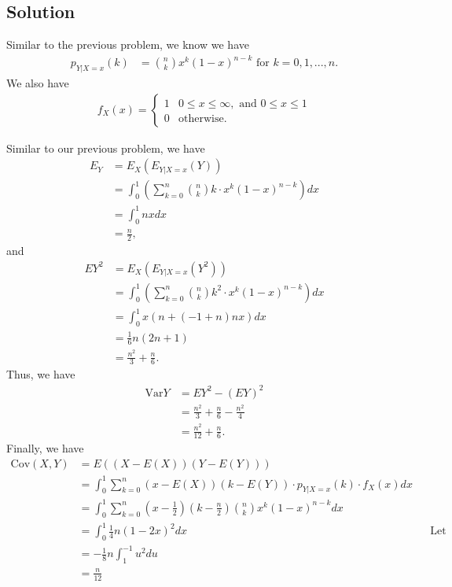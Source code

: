 \documentclass[10pt,a4paper]{article}
\theoremstyle{theorem}
\theoremstyle{definition}
\begin{document}
\subsection*{Solution}
Similar to the previous problem, we know we have
\begin{align*}
p_{Y | X = x}(k) &= {n \choose k} x^k (1 - x)^{n - k} \text{ for } k = 0, 1, ..., n.
\end{align*}
We also have 
\begin{align*}
f_X(x) = \begin{cases} 
      1& 0 \leq x \leq \infty, \text{ and } 0 \leq x \leq 1 \\
      0 & \text{otherwise.}
   \end{cases}
\end{align*}

Similar to our previous problem, we have
\begin{align*}
E_Y &= E_{X}(E_{Y|X = x}(Y))\\
&= \int_0^1 \left(\sum_{k=0}^n  {n \choose k} k \cdot x^k (1 - x)^{n - k} \right) dx\\
&= \int_0^1 nx dx\\
&= \frac{n}{2},
\end{align*}
and
\begin{align*}
EY^2 &= E_{X}(E_{Y|X = x}(Y^2))\\
&= \int_0^1 \left(\sum_{k=0}^n  {n \choose k} k^2 \cdot x^k (1 - x)^{n - k} \right) dx\\
&= \int_0^1 x (n + (-1 + n) n x) dx\\
&= \frac{1}{6} n (2n + 1)\\
&= \frac{n^2}{3} + \frac{n}{6}.
\end{align*}
Thus, we have
\begin{align*}
\text{Var}Y &= EY^2 - (EY)^2\\
&= \frac{n^2}{3} + \frac{n}{6} - \frac{n^2}{4}\\
&= \frac{n^2}{12} + \frac{n}{6}.
\end{align*}
Finally, we have
\begin{align*}
\text{Cov}(X, Y) &= E((X - E(X))(Y - E(Y)))\\
&= \int_0^1 \sum_{k=0}^n (x - E(X))(k - E(Y))\cdot  p_{Y | X = x}(k) \cdot f_X(x) dx\\
&= \int_0^1 \sum_{k=0}^n \left(x - \frac{1}{2}\right)\left(k - \frac{n}{2}\right){n \choose k} x^k (1 - x)^{n - k} dx\\
&= \int_0^1 \frac{1}{4} n (1 - 2x)^2 dx && \text{Let u = 1 - 2x}\\
&= - \frac{1}{8} n \int_1^{-1} u^2 du\\
&=  \frac{n}{12}
\end{align*}
\end{document}
